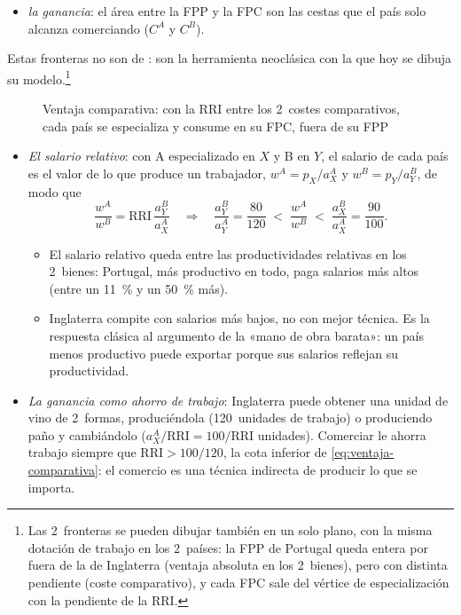 \documentclass[11pt]{article}
\begin{document}
\begin{itemize}
\begin{itemize}
  \item \emph{la ganancia}: el área entre la FPP y la FPC son las cestas que el país solo alcanza comerciando ($C^A$ y $C^B$).
  \end{itemize}
  Estas fronteras no son de : son la herramienta neoclásica con la que hoy se dibuja su modelo\nocite{Haberler1936Theory}.\footnote{Las 2~fronteras se pueden dibujar también en un solo plano, con la misma dotación de trabajo en los 2~países: la FPP de Portugal queda entera por fuera de la de Inglaterra (ventaja absoluta en los 2~bienes), pero con distinta pendiente (coste comparativo), y cada FPC sale del vértice de especialización con la pendiente de la RRI.}
\end{itemize}
\begin{figure}[H]
\centering
\caption{Ventaja comparativa: con la RRI entre los 2~costes comparativos, cada país se especializa y consume en su FPC, fuera de su FPP}\label{fig:ricardo-fpp}
\end{figure}

\begin{itemize}
\item \emph{El salario relativo}: con A especializado en $X$ y B en $Y$, el salario de cada país es el valor de lo que produce un trabajador, $w^A=p_X/a_X^A$ y $w^B=p_Y/a_Y^B$, de modo que
  \begin{equation}\label{eq:salario-relativo}
  \frac{w^A}{w^B}=\mathrm{RRI}\,\frac{a_Y^B}{a_X^A}\quad\Longrightarrow\quad \frac{a_Y^B}{a_Y^A}=\frac{80}{120}\;<\;\frac{w^A}{w^B}\;<\;\frac{a_X^B}{a_X^A}=\frac{90}{100}.
  \end{equation}
  \begin{itemize}
  \item El salario relativo queda entre las productividades relativas en los 2~bienes: Portugal, más productivo en todo, paga salarios más altos (entre un 11~\% y un 50~\% más).
  \item Inglaterra compite con salarios más bajos, no con mejor técnica. Es la respuesta clásica al argumento de la «mano de obra barata»: un país menos productivo puede exportar porque sus salarios reflejan su productividad.
  \end{itemize}
\item \emph{La ganancia como ahorro de trabajo}: Inglaterra puede obtener una unidad de vino de 2~formas, produciéndola (120~unidades de trabajo) o produciendo paño y cambiándolo ($a_X^A/\mathrm{RRI}=100/\mathrm{RRI}$ unidades). Comerciar le ahorra trabajo siempre que $\mathrm{RRI}>100/120$, la cota inferior de \eqref{eq:ventaja-comparativa}: el comercio es una técnica indirecta de producir lo que se importa.
\end{itemize}
\end{document}

